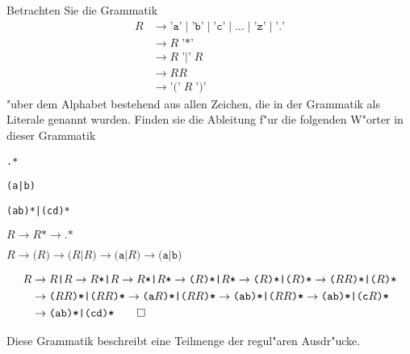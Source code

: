 Betrachten Sie die Grammatik 
\begin{align*}
R&\to \texttt{'a'} \;|\; \texttt{'b'} \;|\; \texttt{'c'} \;|\;\dots\;|\; \texttt{'z'} \;|\; \texttt{'.'}\\
 &\to R\; \texttt{'*'}\\
 &\to R\; \texttt{'|'}\; R\\
 &\to RR\\
 &\to \texttt{'('} \; R \; \texttt{')'}
\end{align*}
"uber dem Alphabet bestehend aus allen Zeichen, die in der Grammatik als
Literale genannt wurden.
Finden sie die Ableitung f"ur die folgenden W"orter in dieser Grammatik
\begin{teilaufgaben}
\item \texttt{.*}
\item \texttt{(a|b)}
\item \texttt{(ab)*|(cd)*}
\end{teilaufgaben}

\begin{loesung}
\begin{teilaufgaben}
\item
\(
R\to R\texttt{*}\to \texttt{.*}
\)
\item \(
R\to \texttt{(} R\texttt{)}
  \to \texttt{(}R\texttt{|}R\texttt{)}
  \to \texttt{(a|}R\texttt{)}
  \to \texttt{(a|b)}
\)
\item
\begin{align*}
R&\to R\texttt{|}R
  \to R\texttt{*|}R
  \to R\texttt{*|}R\texttt{*}
  \to \texttt{(}R\texttt{)*|}R\texttt{*}
  \to \texttt{(}R\texttt{)*|(}R\texttt{)*}
  \to \texttt{(}RR\texttt{)*|(}R\texttt{)*}
\\
 &\to \texttt{(}RR\texttt{)*|(}RR\texttt{)*}
  \to \texttt{(a}R\texttt{)*|(}RR\texttt{)*}
  \to \texttt{(ab)*|(}RR\texttt{)*}
  \to \texttt{(ab)*|(c}R\texttt{)*}
\\
 &\to \texttt{(ab)*|(cd)*}
\qedhere
\end{align*}
\end{teilaufgaben}
\end{loesung}

\begin{diskussion}
Diese Grammatik beschreibt eine Teilmenge der regul"aren Ausdr"ucke.
\end{diskussion}


